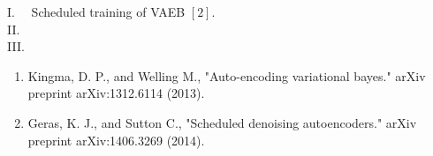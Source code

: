 \documentclass[landscape,a0b,final,a4resizeable]{include/a0poster}
\begin{document}
\begin{poster}
\begin{multicols}{3}
\vspace{0.5em}

I.~~ Scheduled training of VAEB $[2]$.\\
II. ~~\\
III. ~~\\
\vspace{0.5em}

\begin{enumerate}
\item Kingma, D. P., and  Welling M., "Auto-encoding variational bayes." arXiv preprint arXiv:1312.6114 (2013).
\item Geras, K. J., and Sutton C., "Scheduled denoising autoencoders." arXiv preprint arXiv:1406.3269 (2014).
\end{enumerate}

\end{multicols}
\end{poster}
\end{document}
